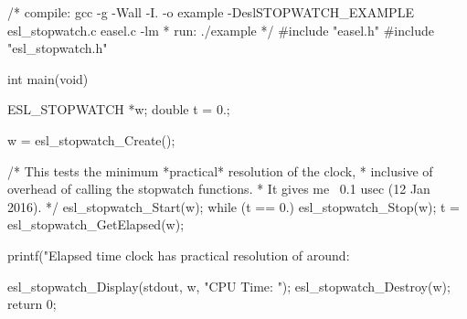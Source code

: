 \begin{cchunk}
/* compile: gcc -g -Wall -I. -o example -DeslSTOPWATCH_EXAMPLE esl_stopwatch.c easel.c -lm
 * run:     ./example
 */
#include "easel.h"
#include "esl_stopwatch.h"

int 
main(void)
{
  ESL_STOPWATCH *w;
  double         t = 0.;
  
  w = esl_stopwatch_Create(); 

  /* This tests the minimum *practical* resolution of the clock,
   * inclusive of overhead of calling the stopwatch functions.
   * It gives me ~0.1 usec (12 Jan 2016).
   */
  esl_stopwatch_Start(w);
  while (t == 0.) 
    {
      esl_stopwatch_Stop(w);
      t = esl_stopwatch_GetElapsed(w);
    }

  printf("Elapsed time clock has practical resolution of around: %

  esl_stopwatch_Display(stdout, w, "CPU Time: ");
  esl_stopwatch_Destroy(w);
  return 0;
}
\end{cchunk}
